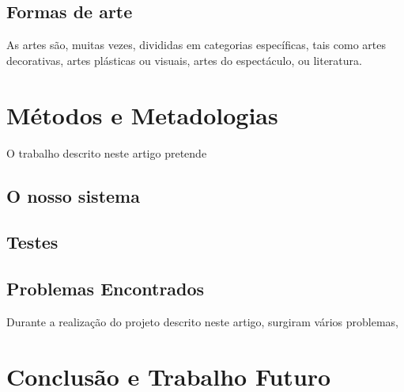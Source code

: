 \documentclass[conference]{IEEEtran}
\begin{document}
\subsection{Formas de arte}
As artes são, muitas vezes, divididas em categorias específicas, tais como artes decorativas, 
artes plásticas ou visuais, artes do espectáculo, ou literatura.


\subsection{}


\section{Métodos e Metadologias}

O trabalho descrito neste artigo pretende 

\subsection{O nosso sistema}


\subsubsection{}


\subsection{Testes}

\subsection{Problemas Encontrados}

Durante a realização do projeto descrito neste artigo, surgiram vários problemas, 

\section{Conclusão e Trabalho Futuro}



\end{document}
